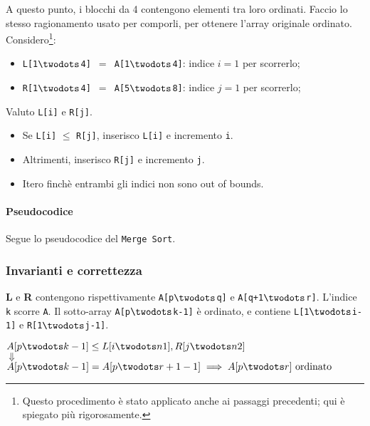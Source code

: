 A questo punto, i blocchi da 4 contengono elementi tra loro ordinati. Faccio lo stesso ragionamento
usato per comporli, per ottenere l'array originale ordinato. Considero\footnote{Questo procedimento è stato applicato %
anche ai passaggi precedenti; qui è spiegato più rigorosamente.}:
\begin{itemize}[noitemsep]
    \item \texttt{L[1$\twodots$4] $=$ A[1$\twodots$4]}: indice $i = 1$ per scorrerlo;
    \item \texttt{R[1$\twodots$4] $=$ A[5$\twodots$8]}: indice $j = 1$ per scorrerlo;
\end{itemize}

Valuto \texttt{L[i]} e \texttt{R[j]}. \par
\begin{itemize}[noitemsep]
    \item Se \texttt{L[i]} $\leq$ \texttt{R[j]}, inserisco \texttt{L[i]} e incremento \texttt{i}. \par
    \item Altrimenti, inserisco \texttt{R[j]} e incremento \texttt{j}.
    \item Itero finchè entrambi gli indici non sono out of bounds.
\end{itemize}

\paragraph{Pseudocodice} Segue lo pseudocodice del 
\texttt{Merge Sort}.





\subsubsection{Invarianti e correttezza}

\textbf{L} e \textbf{R} contengono rispettivamente 
\texttt{A[p$\twodots$q]} e \texttt{A[q+1$\twodots$r]}. 
L'indice \texttt{k} scorre \texttt{A}. Il sotto-array \texttt{A[p$\twodots$k-1]}
è ordinato, e contiene \texttt{L[1$\twodots$i-1]} e \texttt{R[1$\twodots$j-1]}.

\begin{center}
    $A[p \twodots k-1] \leq L[i \twodots n1], R[j \twodots n2]$ \\
    $\Downarrow$ \\
    $A[p \twodots k-1] = A[p \twodots r+1-1] \implies A[p \twodots r] \text{ ordinato}$
\end{center}

